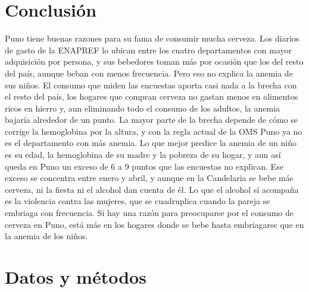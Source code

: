 \documentclass[11pt]{article}
\begin{document}
\section{Conclusión}

Puno tiene buenas razones para su fama de consumir mucha cerveza. Los diarios de gasto de la ENAPREF lo ubican entre los cuatro departamentos con mayor adquisición por persona, y sus bebedores toman más por ocasión que los del resto del país, aunque beban con menos frecuencia. Pero eso no explica la anemia de sus niños. El consumo que miden las encuestas aporta casi nada a la brecha con el resto del país, los hogares que compran cerveza no gastan menos en alimentos ricos en hierro y, aun eliminando todo el consumo de los adultos, la anemia bajaría alrededor de un punto. La mayor parte de la brecha depende de cómo se corrige la hemoglobina por la altura, y con la regla actual de la OMS Puno ya no es el departamento con más anemia. Lo que mejor predice la anemia de un niño es su edad, la hemoglobina de su madre y la pobreza de su hogar, y aun así queda en Puno un exceso de 6 a 9 puntos que las encuestas no explican. Ese exceso se concentra entre enero y abril, y aunque en la Candelaria se bebe más cerveza, ni la fiesta ni el alcohol dan cuenta de él. Lo que el alcohol sí acompaña es la violencia contra las mujeres, que se cuadruplica cuando la pareja se embriaga con frecuencia. Si hay una razón para preocuparse por el consumo de cerveza en Puno, está más en los hogares donde se bebe hasta embriagarse que en la anemia de los niños.

\section*{Datos y métodos}
\end{document}
